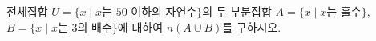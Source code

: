전체집합 $U=\{x \mid x$는 $50$ 이하의 자연수$\}$의 두 부분집합 $A=\{x \mid x$는 홀수$\}$, $B=\{x \mid x$는 $3$의 배수$\}$에 대하여 $n(A\cup B)$를 구하시오.
